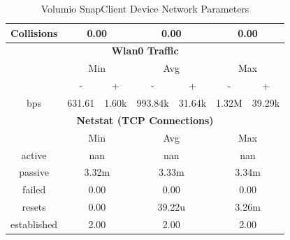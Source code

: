 \documentclass[11pt,a4paper,headinclude=false,footinclude=false]{scrreprt}
\begin{document}
\begin{table}[H]
\begin{tabular}{||c|c|c|c|c|c|c||}
    \hline
    Collisions & \multicolumn{2}{|c|}{0.00} & \multicolumn{2}{|c|}{0.00} & \multicolumn{2}{|c|}{0.00} \\
    \hline\hline
    \multicolumn{7}{|c|}{\textbf{Wlan0 Traffic}} \\
    \hline\hline
      & \multicolumn{2}{|c|}{Min} & \multicolumn{2}{|c|}{Avg} & \multicolumn{2}{|c|}{Max} \\
    \hline
      & - & + & - & + & - & + \\
    \hline
    bps  & 631.61 & 1.60k & 993.84k & 31.64k & 1.32M & 39.29k \\
    \hline\hline
    \multicolumn{7}{|c|}{\textbf{Netstat (TCP Connections)}} \\
    \hline\hline
      & \multicolumn{2}{|c|}{Min} & \multicolumn{2}{|c|}{Avg} & \multicolumn{2}{|c|}{Max} \\
    \hline
    active & \multicolumn{2}{|c|}{nan} & \multicolumn{2}{|c|}{nan} & \multicolumn{2}{|c|}{nan} \\
    \hline
    passive & \multicolumn{2}{|c|}{3.32m} & \multicolumn{2}{|c|}{3.33m} & \multicolumn{2}{|c|}{3.34m} \\
    \hline
    failed & \multicolumn{2}{|c|}{0.00} & \multicolumn{2}{|c|}{0.00} & \multicolumn{2}{|c|}{0.00} \\
    \hline
    resets & \multicolumn{2}{|c|}{0.00} & \multicolumn{2}{|c|}{39.22u} & \multicolumn{2}{|c|}{3.26m} \\
    \hline
    established & \multicolumn{2}{|c|}{2.00} & \multicolumn{2}{|c|}{2.00} & \multicolumn{2}{|c|}{2.00} \\
    \hline\hline
    \end{tabular}
    \caption{Volumio SnapClient Device Network Parameters}
    \label{VolumioclientNetTab}
\end{table}
\end{document}
